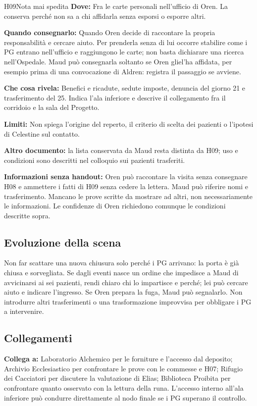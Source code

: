 \documentclass[11pt,a4paper]{article}
\newcommand{\linkto}[1]{\begin{routebox}\textbf{Collega a:} #1\end{routebox}}
\begin{document}
{}
\begin{handoutbox}{H09}{Nota mai spedita}
\textbf{Dove:} Fra le carte personali nell'ufficio di Oren. La conserva perché non sa a chi affidarla senza esporsi o esporre altri.

\textbf{Quando consegnarlo:} Quando Oren decide di raccontare la propria responsabilità e cercare aiuto. Per prenderla senza di lui occorre stabilire come i PG entrano nell'ufficio e raggiungono le carte; non basta dichiarare una ricerca nell'Ospedale. Maud può consegnarla soltanto se Oren gliel'ha affidata, per esempio prima di una convocazione di Aldren: registra il passaggio se avviene.

\textbf{Che cosa rivela:} Benefici e ricadute, sedute imposte, denuncia del giorno 21 e trasferimento del 25. Indica l'ala inferiore e descrive il collegamento fra il corridoio e la sala del Progetto.

\textbf{Limiti:} Non spiega l'origine del reperto, il criterio di scelta dei pazienti o l'ipotesi di Celestine sul contatto.
\end{handoutbox}

\textbf{Altro documento:} la lista conservata da Maud resta distinta da H09; uso e condizioni sono descritti nel colloquio sui pazienti trasferiti.

\textbf{Informazioni senza handout:} Oren può raccontare la visita senza consegnare H08 e ammettere i fatti di H09 senza cedere la lettera. Maud può riferire nomi e trasferimento. Mancano le prove scritte da mostrare ad altri, non necessariamente le informazioni. Le confidenze di Oren richiedono comunque le condizioni descritte sopra.

\subsection{Evoluzione della scena}
\begin{clockbox}
Non far scattare una nuova chiusura solo perché i PG arrivano: la porta è già chiusa e sorvegliata. Se dagli eventi nasce un ordine che impedisce a Maud di avvicinarsi ai sei pazienti, rendi chiaro chi lo impartisce e perché; lei può cercare aiuto e indicare l'ingresso. Se Oren prepara la fuga, Maud può segnalarlo. Non introdurre altri trasferimenti o una trasformazione improvvisa per obbligare i PG a intervenire.
\end{clockbox}

\subsection{Collegamenti}
\linkto{Laboratorio Alchemico per le forniture e l'accesso dal deposito; Archivio Ecclesiastico per confrontare le prove con le commesse e H07; Rifugio dei Cacciatori per discutere la valutazione di Elias; Biblioteca Proibita per confrontare quanto osservato con la lettura della runa. L'accesso interno all'ala inferiore può condurre direttamente al nodo finale se i PG superano il controllo.}
\end{document}
